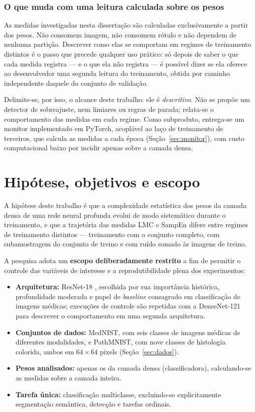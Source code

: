 \subsubsection*{O que muda com uma leitura calculada sobre os pesos}

As medidas investigadas nesta dissertação são calculadas exclusivamente a partir
dos pesos. Não consomem imagem, não consomem rótulo e não dependem de nenhuma
partição. Descrever como elas se comportam em regimes de treinamento distintos
é o passo que precede qualquer uso prático: só depois de saber o que cada medida
registra --- e o que ela não registra --- é possível dizer se ela oferece ao
desenvolvedor uma segunda leitura do treinamento, obtida por caminho
independente daquele do conjunto de validação.

Delimite-se, por isso, o alcance deste trabalho: ele é \emph{descritivo}. Não se
propõe um detector de sobreajuste, nem limiares ou regras de parada; relata-se o
comportamento das medidas em cada regime. Como subproduto, entrega-se um monitor
implementado em PyTorch, acoplável ao laço de treinamento de terceiros, que
calcula as medidas a cada época (Seção~\ref{sec:monitor}), com custo
computacional baixo por incidir apenas sobre a camada densa.

\section{Hipótese, objetivos e escopo}
\label{sec:intro-objetivos}

A hipótese deste trabalho é que a complexidade estatística dos pesos da
camada densa de uma rede neural profunda evolui de modo sistemático durante
o treinamento, e que a trajetória das medidas LMC e SampEn difere entre
regimes de treinamento distintos --- treinamento com o conjunto completo,
com subamostragem do conjunto de treino e com ruído somado às imagens de
treino.

A pesquisa adota um \textbf{escopo deliberadamente restrito} a fim de
permitir o controle das variáveis de interesse e a reprodutibilidade
plena dos experimentos:

\begin{itemize}
  \item \textbf{Arquitetura:} ResNet-18 \cite{he2016}, escolhida
        por sua importância histórica, profundidade moderada e papel de
        \emph{baseline} consagrado em classificação de imagens médicas;
        execuções de controle são repetidas com a DenseNet-121 para
        descrever o comportamento em uma segunda arquitetura.
  \item \textbf{Conjuntos de dados:} MedNIST, com seis classes de imagens
        médicas de diferentes modalidades, e PathMNIST, com nove classes de
        histologia colorida, ambos em $64 \times 64$ pixels
        (Seção~\ref{sec:dados}).
  \item \textbf{Pesos analisados:} apenas os da camada densa
        (classificadora), calculando-se as medidas sobre a camada inteira.
  \item \textbf{Tarefa única:} classificação multiclasse, excluindo-se
        explicitamente segmentação semântica, detecção e tarefas
        ordinais.
\end{itemize}

